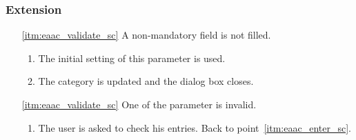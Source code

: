 \subsubsection{Extension}
\begin{enumerate}
	\item[\ref{itm:eaac_validate_sc}] A non-mandatory field is not filled.
	\begin{enumerate}[i]
		\item The initial setting of this parameter is used. 
		\item The category is updated and the dialog box closes.
	\end{enumerate}
	
	\item[\ref{itm:eaac_validate_sc}] One of the parameter is invalid.
	\begin{enumerate}[i]
		\item The user is asked to check his entries. Back to point~\ref{itm:eaac_enter_sc}.
	\end{enumerate}
\end{enumerate}